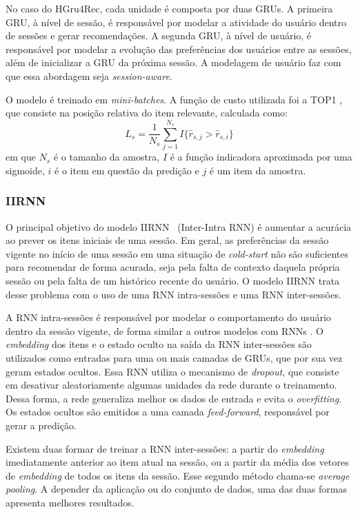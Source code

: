 No caso do HGru4Rec, cada unidade é composta por duas GRUs. A primeira GRU, à
nível de sessão, é responsável por modelar a atividade do usuário dentro de
sessões e gerar recomendações. A segunda GRU, à nível de usuário, é responsável
por modelar a evolução das preferências dos usuários entre as sessões, além de
inicializar a GRU da próxima sessão. A modelagem de usuário faz com que essa abordagem
seja \textit{session-aware}.

O modelo é treinado em \textit{mini-batches}. A função de custo utilizada foi a
  TOP1 \cite{HidasiKBT15}, que consiste na posição relativa do item relevante,
  calculada como:
  \begin{equation}
    L_s = \frac{1}{N_s} \sum_{j=1}^{N_s}I\{ \hat{r}_{s,j} > \hat{r}_{s,i}\}
  \end{equation}
  em que $N_s$ é o tamanho da amostra, $I$ é a função indicadora aproximada por
  uma sigmoide, $i$ é o item em questão da predição e $j$ é um item da amostra.

\subsubsection{IIRNN}
  O principal objetivo do modelo IIRNN~\cite{skrede2017inter} (Inter-Intra RNN) é aumentar a acurácia
ao prever os itens iniciais de uma sessão. Em geral, as preferências da sessão
vigente no início de uma sessão em uma situação de \textit{cold-start} não são
suficientes para recomendar de forma acurada, seja pela falta de contexto
daquela própria sessão ou pela falta de um histórico recente do usuário. O
modelo IIRNN trata desse problema com o uso de uma RNN intra-sessões e uma RNN
inter-sessões.

A RNN intra-sessões é responsável por modelar o comportamento do usuário dentro
da sessão vigente, de forma similar a outros modelos com RNNs
\cite{HidasiKBT15}. O \textit{embedding} dos itens e o estado oculto na saída da
RNN inter-sessões são utilizados como entradas para uma ou mais camadas de GRUs,
que por sua vez geram estados ocultos. Essa RNN utiliza o mecanismo de
\textit{dropout}, que consiste em desativar aleatoriamente algumas unidades da
rede durante o treinamento. Dessa forma, a rede generaliza melhor os dados de
entrada e evita o \textit{overfitting}. Os estados ocultos são emitidos a uma camada
\textit{feed-forward}, responsável por gerar a predição.

Existem duas formar de treinar a RNN inter-sessões: a partir do
\textit{embedding} imediatamente anterior ao item atual na sessão, ou a partir
da média dos vetores de \textit{embedding} de todos os itens da sessão. Esse
segundo método chama-se \textit{average pooling}. A depender da aplicação ou do
conjunto de dados, uma das duas formas apresenta melhores resultados.

